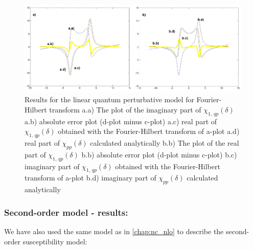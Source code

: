 \documentclass[12pt,twoside,a4paper]{article}
\numberwithin{equation}{subsection}
\numberwithin{figure}{subsection}
\begin{document}
\begin{figure}
  \includegraphics[width=150mm]{img/four_qp1.png}
  \caption{Results for the linear quantum perturbative model for Fourier-Hilbert transform
    a.a) The plot of the imaginary part of ${\chi_{1, \,qp}}(\delta )$
    a.b) absolute error plot (d-plot minus c-plot) 
    a.c) real part of ${\chi_{1, \,qp}}(\delta )$ obtained with the Fourier-Hilbert transform of a-plot 
    a.d) real part of ${\chi_{pp}}(\delta )$ calculated analytically 
    b.b) The plot of the real part of ${\chi_{1, \,qp}}(\delta )$ 
    b.b) absolute error plot (d-plot minus c-plot) 
    b.c) imaginary part of ${\chi_{1, \,qp}}(\delta )$ obtained with the Fourier-Hilbert transform of a-plot 
    b.d) imaginary part of ${\chi_{pp}}(\delta )$ calculated analytically  
    \label{fig:four_qp1}
  }
\end{figure}

\subsubsection*{Second-order model - results:}

We have also used the same model as in \ref{chap:nc_nlo} to describe the second-order susceptibility model:
\end{document}
